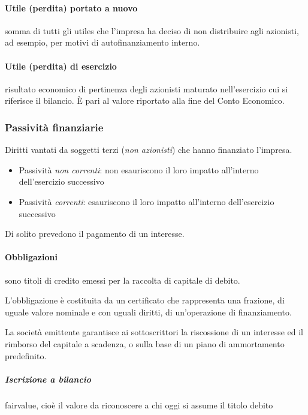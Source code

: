 \paragraph{Utile (perdita) portato a nuovo} somma di tutti gli \glspl{utile} che
l’impresa ha deciso di non distribuire agli azionisti, ad esempio, per motivi di
autofinanziamento interno.

\paragraph{Utile (perdita) di esercizio} risultato economico di pertinenza degli
azionisti maturato nell’esercizio cui si riferisce il bilancio.
È pari al valore riportato alla fine del Conto Economico.



\subsubsection{Passività finanziarie}
Diritti vantati da soggetti terzi (\emph{non azionisti}) che hanno finanziato l’impresa.
\begin{itemize}
    \item Passività \emph{non correnti}: non esauriscono il loro impatto all’interno dell’\gls{esercizio} successivo
    \item Passività \emph{correnti}: esauriscono il loro impatto all’interno dell’\gls{esercizio} successivo 
\end{itemize}
Di solito prevedono il pagamento di un interesse.

\paragraph{Obbligazioni} sono titoli di credito emessi per la raccolta di capitale di debito.

L’obbligazione è costituita da un certificato che rappresenta una frazione, di uguale
valore nominale e con uguali diritti, di un’operazione di finanziamento.

La società emittente garantisce ai sottoscrittori la riscossione di un interesse
ed il rimborso del capitale a scadenza, o sulla base di un piano di ammortamento predefinito.

\subparagraph{Iscrizione a bilancio} \gls{fairvalue}, cioè il valore da riconoscere
a chi oggi si assume il titolo debito

